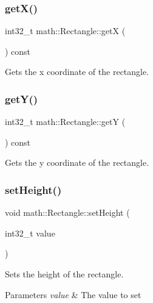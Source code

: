 \subsubsection{\texorpdfstring{getX()}{getX()}}
{\footnotesize\ttfamily int32\+\_\+t math\+::\+Rectangle\+::getX (\begin{DoxyParamCaption}{ }\end{DoxyParamCaption}) const\hspace{0.3cm}{\ttfamily [inline]}}



Gets the x coordinate of the rectangle. 

\mbox{\label{structmath_1_1_rectangle_a124a70fdc8d5aac728b35330ae487110}} 
\subsubsection{\texorpdfstring{getY()}{getY()}}
{\footnotesize\ttfamily int32\+\_\+t math\+::\+Rectangle\+::getY (\begin{DoxyParamCaption}{ }\end{DoxyParamCaption}) const\hspace{0.3cm}{\ttfamily [inline]}}



Gets the y coordinate of the rectangle. 

\mbox{\label{structmath_1_1_rectangle_a947a4b1a71debe60b17636e46b93e347}} 
\subsubsection{\texorpdfstring{setHeight()}{setHeight()}}
{\footnotesize\ttfamily void math\+::\+Rectangle\+::set\+Height (\begin{DoxyParamCaption}\item[{int32\+\_\+t}]{value }\end{DoxyParamCaption})\hspace{0.3cm}{\ttfamily [inline]}}



Sets the height of the rectangle. 


\begin{DoxyParams}{Parameters}
{\em value} & The value to set\\
\hline
\end{DoxyParams}
\mbox{\label{structmath_1_1_rectangle_a4ed00c189e28106206aa239687e3a9ad}} 
